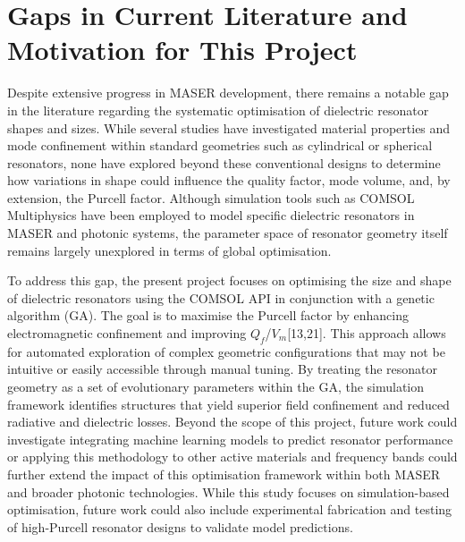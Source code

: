 \section{Gaps in Current Literature and Motivation for This Project}
\label{sec:section5}
Despite extensive progress in MASER development, there remains a notable gap in
the literature regarding the systematic optimisation of dielectric resonator
shapes and sizes. While several studies have investigated material properties
and mode confinement within standard geometries such as cylindrical or spherical
resonators\autocite{meher2020design}, none have explored beyond these
conventional designs to determine how variations in shape could influence the
quality factor, mode volume, and, by extension, the Purcell factor. Although
simulation tools such as COMSOL Multiphysics\textregistered{} have been employed
to model specific dielectric resonators in MASER and photonic systems, the
parameter space of resonator geometry itself remains largely unexplored in terms
of global optimisation\autocite{karpov2022evolutionary,stanovov2022automatic}.

To address this gap, the present project focuses on optimising the size and
shape of dielectric resonators using the COMSOL API in conjunction with a
genetic algorithm (GA). The goal is to maximise the Purcell factor by enhancing
electromagnetic confinement and improving $Q_f$/$V_m$[13,21]. This approach
allows for automated exploration of complex geometric configurations that may
not be intuitive or easily accessible through manual
tuning\autocite{goh2006design,karpov2022evolutionary,stanovov2022automatic}. By
treating the resonator geometry as a set of evolutionary parameters within the
GA, the simulation framework identifies structures that yield superior field
confinement and reduced radiative and dielectric
losses\autocite{tsuji2009multi,monzo2007application}. Beyond the scope of this
project, future work could investigate integrating machine learning models to
predict resonator performance or applying this methodology to other active
materials and frequency bands could further extend the impact of this
optimisation framework within both MASER and broader photonic technologies.
While this study focuses on simulation-based optimisation, future work could
also include experimental fabrication and testing of high-Purcell resonator
designs to validate model predictions\autocite{ng2022move,ng2023maser}.

